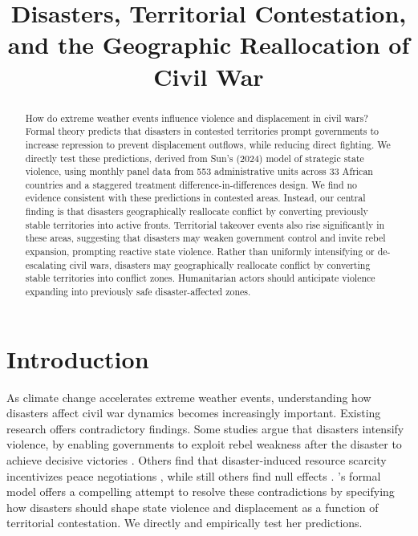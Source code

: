 \documentclass[bibtex]{article}
\title{Disasters, Territorial Contestation, and the Geographic Reallocation of Civil War}
\begin{document}
\maketitle

\hypersetup{
    colorlinks=true,
    linkcolor=blue,
    citecolor=blue,
    urlcolor=blue,
    filecolor=blue
}
\begin{frontmatter}
\begin{abstract}

How do extreme weather events influence violence and displacement in civil wars? Formal theory predicts that disasters in contested territories prompt governments to increase repression to prevent displacement outflows, while reducing direct fighting. We directly test these predictions, derived from Sun's (2024) model of strategic state violence, using monthly panel data from 553 administrative units across 33 African countries and a staggered treatment difference-in-differences design. We find no evidence consistent with these predictions in contested areas. Instead, our central finding is that disasters geographically reallocate 
conflict by converting previously stable territories into active fronts. Territorial takeover events also rise significantly in these areas, suggesting that disasters may weaken government control and invite rebel expansion, prompting reactive state violence. Rather than uniformly intensifying or de-escalating civil wars, disasters may geographically reallocate conflict by converting stable territories into conflict zones. Humanitarian actors should anticipate violence expanding into previously safe disaster-affected zones.




\end{abstract}
\end{frontmatter}
\newpage

\section*{Introduction}

As climate change accelerates extreme weather events, understanding how disasters affect civil war dynamics becomes increasingly important. Existing research offers contradictory findings. Some studies argue that disasters intensify violence, by enabling governments to exploit rebel weakness after the disaster to achieve decisive victories \citep{zhao_2025, tennant2024}. Others find that disaster-induced resource scarcity incentivizes peace negotiations \citep{tominaga_when_2021}, while still others find null effects \citep{bergholt2012climate, Omelicheva01102011, doi:10.1177/0022343320973741}. \citeauthor{sun2024strategic}'s \citeyearpar{sun2024strategic} formal model offers a compelling attempt to resolve these contradictions by specifying how disasters should shape state violence and displacement as a function of territorial contestation. We directly and empirically test her predictions.
\end{document}
